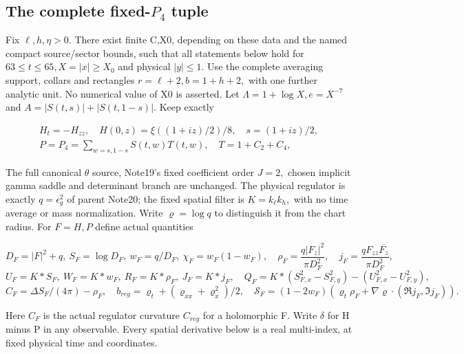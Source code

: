 \subsection[The complete fixed-P4 tuple]{The complete fixed-$P_4$ tuple}
\label{sec:fixed-p4-proof}
\begin{theorem}
\label{thm:fixed-p4-consumer}

Fix \(\ell,h,\eta>0.\) There exist finite C,X0, depending on these data and the named compact source/sector bounds, such that all statements below hold for \(63\le t\le 65, X=|x|\ge X_{0}\) and physical \(|y|\le 1.\) Use the complete averaging support, collars and rectangles \(r=\ell+2, b=1+h+2,\) with one further analytic unit. No numerical value of X0 is asserted. Let \(\Lambda=1+\log X, e=X^{-7}\) and \(A=|S(t,s)|+|S(t,1-s)|.\) Keep exactly

\[
\begin{gathered}
H_t=-H_{zz},\quad H(0,z)=\xi((1+iz)/2)/8,\quad s=(1+iz)/2,\\
P=P_4=\sum_{w=s,1-s}S(t,w)T(t,w),\quad T=1+C_2+C_4,
\end{gathered}
\tag{PT1}\label{eq:ansatz-pt1}
\]

The full canonical \(\theta\) source, Note19's fixed coefficient order \(J=2,\) chosen implicit gamma saddle and determinant branch are unchanged. The physical regulator is exactly \(q=\epsilon_{g}^{2}\) of parent Note20; the fixed spatial filter is \(K=k_{\ell} k_{h},\) with no time average or mass normalization. Write \(\varrho=\log q\) to distinguish it from the chart radius. For \(F=H,P\) define actual quantities

\[
D_F=|F|^2+q,\ S_F=\log D_F,\ w_F=q/D_F,\ \chi_F=w_F(1-w_F),
\quad \rho_F=\frac{q|F_z|^2}{\pi D_F^2},\quad
j_F=\frac{qF_{zz}\overline{F_z}}{\pi D_F^2},
\]
\[
U_F=K*S_F,\ W_F=K*w_F,\ R_F=K*\rho_F,\ J_F=K*j_F,
\quad Q_F=K*(S_{F,x}^2-S_{F,y}^2)-(U_{F,x}^2-U_{F,y}^2),
\]
\[
C_F=\Delta S_F/(4\pi)-\rho_F,\quad
b_{reg}=\varrho_t+(\varrho_{xx}+\varrho_x^2)/2,
\quad \mathcal S_F=(1-2w_F)(\varrho_t\rho_F+
                     \nabla\varrho\cdot(\Re j_F,\Im j_F)).
\tag{PT2}\label{eq:ansatz-pt2}
\]

Here \(C_{F}\) is the actual regulator curvature \(C_{reg}\) for a holomorphic F. Write \(\delta\) for H minus P in any observable. Every spatial derivative below is a real multi-index, at fixed physical time and coordinates.


\end{theorem}
